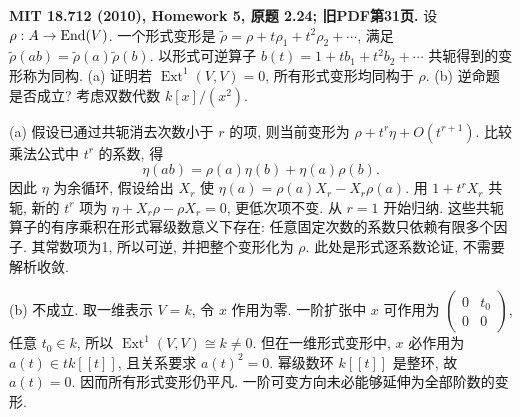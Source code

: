 \begin{exercise}\label{hw:2.24}
\textbf{MIT 18.712 (2010), Homework 5, 原题 2.24; 旧PDF第31页.}
设 $\rho:A\to\operatorname{End}(V)$. 一个形式变形是 $\widetilde\rho=\rho+t\rho_1+t^2\rho_2+\cdots$, 满足 $\widetilde\rho(ab)=\widetilde\rho(a)\widetilde\rho(b)$. 以形式可逆算子 $b(t)=1+tb_1+t^2b_2+\cdots$ 共轭得到的变形称为同构.
(a) 证明若 $\operatorname{Ext}^1(V,V)=0$, 所有形式变形均同构于 $\rho$.
(b) 逆命题是否成立? 考虑双数代数 $k[x]/(x^2)$.
\end{exercise}
\begin{solution}
(a) 假设已通过共轭消去次数小于 $r$ 的项, 则当前变形为 $\rho+t^r\eta+O(t^{r+1})$. 比较乘法公式中 $t^r$ 的系数, 得
\[
 \eta(ab)=\rho(a)\eta(b)+\eta(a)\rho(b).
\]
因此 $\eta$ 为余循环, 假设给出 $X_r$ 使 $\eta(a)=\rho(a)X_r-X_r\rho(a)$. 用 $1+t^rX_r$ 共轭, 新的 $t^r$ 项为 $\eta+X_r\rho-\rho X_r=0$, 更低次项不变. 从 $r=1$ 开始归纳. 这些共轭算子的有序乘积在形式幂级数意义下存在: 任意固定次数的系数只依赖有限多个因子. 其常数项为1, 所以可逆, 并把整个变形化为 $\rho$. 此处是形式逐系数论证, 不需要解析收敛.

(b) 不成立. 取一维表示 $V=k$, 令 $x$ 作用为零. 一阶扩张中 $x$ 可作用为 $\begin{pmatrix}0&t_0\\0&0\end{pmatrix}$, 任意 $t_0\in k$, 所以 $\operatorname{Ext}^1(V,V)\cong k\ne0$. 但在一维形式变形中, $x$ 必作用为 $a(t)\in tk[[t]]$, 且关系要求 $a(t)^2=0$. 幂级数环 $k[[t]]$ 是整环, 故 $a(t)=0$. 因而所有形式变形仍平凡. 一阶可变方向未必能够延伸为全部阶数的变形.
\end{solution}


